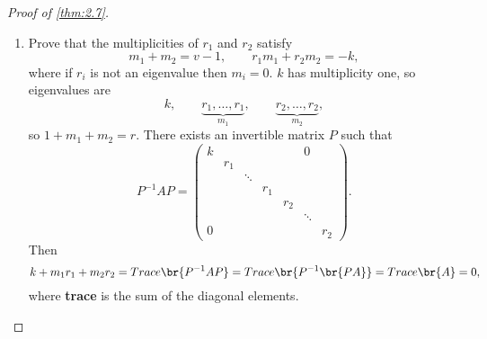 \begin{proof}[Proof of \ref{thm:2.7}]
\begin{enumerate}[leftmargin=0.5in, label=Step \arabic*.]
\item Prove that the multiplicities of $ r_1 $ and $ r_2 $ satisfy
$$ m_1 + m_2 = v - 1, \qquad r_1m_1 + r_2m_2 = -k, $$
where if $ r_i $ is not an eigenvalue then $ m_i = 0 $. $ k $ has multiplicity one, so eigenvalues are
$$ k, \qquad \underbrace{r_1, \dots, r_1}_{m_1}, \qquad \underbrace{r_2, \dots, r_2}_{m_2}, $$
so $ 1 + m_1 + m_2 = r $. There exists an invertible matrix $ P $ such that
$$ P^{-1}AP =
\begin{pmatrix}
k & & & & & 0 \\
& r_1 & & & & & \\
& & \ddots & & & & \\
& & & r_1 & & & \\
& & & & r_2 & & \\
& & & & & \ddots & \\
0 & & & & & & r_2
\end{pmatrix}.
$$
Then
$$ k + m_1r_1 + m_2r_2 = Trace\br{P^{-1}AP} = Trace\br{P^{-1}\br{PA}} = Trace\br{A} = 0, $$
where \textbf{trace} is the sum of the diagonal elements.



\end{enumerate}
\end{proof}
